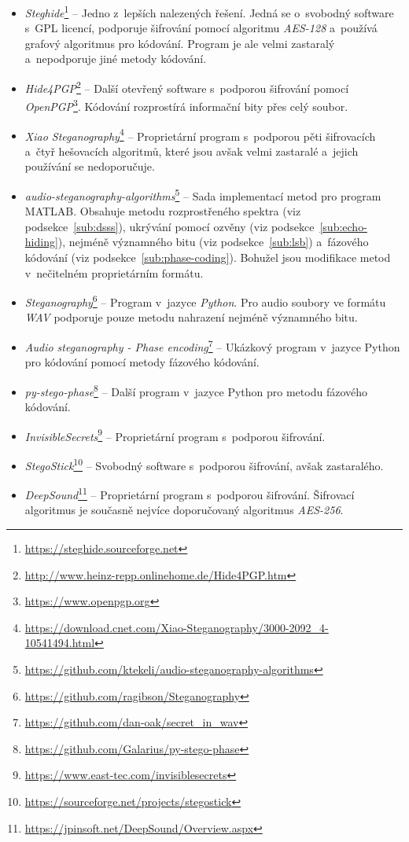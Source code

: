 \begin{itemize}
    \item \textit{Steghide}\footnote{\url{https://steghide.sourceforge.net}} --
        Jedno z~lepších nalezených řešení. Jedná se o~svobodný software s~GPL
        licencí, podporuje šifrování pomocí algoritmu \textit{AES-128}
        a~používá grafový algoritmus pro kódování. Program je ale velmi
        zastaralý a~nepodporuje jiné metody kódování.
    \item \textit{Hide4PGP}\footnote{\url{http://www.heinz-repp.onlinehome.de/Hide4PGP.htm}}
        -- Další otevřený software s~podporou šifrování pomocí
        \textit{OpenPGP}\footnote{\url{https://www.openpgp.org}}. Kódování
        rozprostírá informační bity přes celý soubor.
    \item \textit{Xiao Steganography}\footnote{\url{https://download.cnet.com/Xiao-Steganography/3000-2092_4-10541494.html}}
        -- Proprietární program s~podporou pěti šifrovacích a~čtyř hešovacích
        algoritmů, které jsou avšak velmi zastaralé a~jejich používání se
        nedoporučuje.
    \item \textit{audio-steganography-algorithms}\footnote{\url{https://github.com/ktekeli/audio-steganography-algorithms}}
        -- Sada implementací metod pro program MATLAB. Obsahuje metodu
        rozprostřeného spektra (viz podsekce~\ref{sub:dsss}), ukrývání pomocí
        ozvěny (viz podsekce~\ref{sub:echo-hiding}), nejméně významného bitu
        (viz podsekce~\ref{sub:lsb}) a~fázového kódování (viz
        podsekce~\ref{sub:phase-coding}). Bohužel jsou modifikace metod
        v~nečitelném proprietárním formátu.
    \item \textit{Steganography}\footnote{\url{https://github.com/ragibson/Steganography}}
        -- Program v~jazyce \textit{Python}. Pro audio soubory ve formátu
        \textit{WAV} podporuje pouze metodu nahrazení nejméně významného bitu.
    \item \textit{Audio steganography - Phase encoding}\footnote{\url{https://github.com/dan-oak/secret_in_wav}}
        -- Ukázkový program v~jazyce Python pro kódování pomocí metody fázového
        kódování.
    \item \textit{py-stego-phase}\footnote{\url{https://github.com/Galarius/py-stego-phase}}
        -- Další program v~jazyce Python pro metodu fázového kódování.
    \item \textit{InvisibleSecrets}\footnote{\url{https://www.east-tec.com/invisiblesecrets}}
        -- Proprietární program s~podporou šifrování.
    \item \textit{StegoStick}\footnote{\url{https://sourceforge.net/projects/stegostick}}
        -- Svobodný software s~podporou šifrování, avšak zastaralého.
    \item \textit{DeepSound}\footnote{\url{https://jpinsoft.net/DeepSound/Overview.aspx}}
        -- Proprietární program s~podporou šifrování. Šifrovací algoritmus je
        současně nejvíce doporučovaný algoritmus \textit{AES-256}.
\end{itemize}

